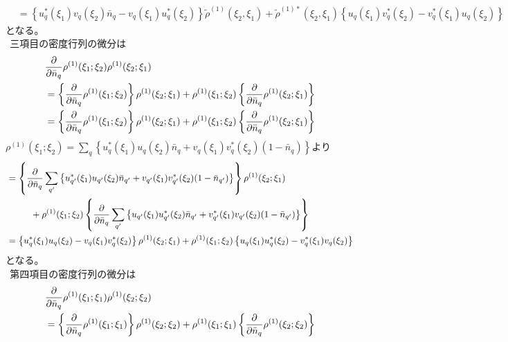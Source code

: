 \documentclass[dvipdfmx, 11pt, a4paper]{jsarticle}
\numberwithin{equation}{section}
\theoremstyle{definition}
\begin{document}
\begin{derivationBox}
\begin{align}
            &= \left\{ u_q^*(\xi_1) v_q(\xi_2)\bar{n}_q - v_q(\xi_1) u_q^*(\xi_2)\right\} \tilde{\rho}^{(1)}(\xi_2,\xi_1) +  \tilde{\rho}^{(1)*}(\xi_2,\xi_1)\left\{  u_q(\xi_1)v^*_q(\xi_2) - v^*_q(\xi_1)u_q(\xi_2)  \right\}
        \end{align}
        となる。\\
        $\ \ $三項目の密度行列の微分は
        \begin{align}
            &\frac{\partial}{\partial \bar{n}_q} \rho^{(1)}(\xi_1;\xi_2) \rho^{(1)}(\xi_2;\xi_1) \notag \\
            &= \left\{ \frac{\partial}{\partial \bar{n}_q} \rho^{(1)}(\xi_1;\xi_2) \right\} \rho^{(1)}(\xi_2;\xi_1)  +  \rho^{(1)}(\xi_1;\xi_2) \left\{ \frac{\partial}{\partial \bar{n}_q} \rho^{(1)}(\xi_2;\xi_1) \right\} \notag \\
            &= \left\{ \frac{\partial}{\partial \bar{n}_q} \rho^{(1)}(\xi_1;\xi_2) \right\} \rho^{(1)}(\xi_2;\xi_1)  +  \rho^{(1)}(\xi_1;\xi_2) \left\{ \frac{\partial}{\partial \bar{n}_q} \rho^{(1)}(\xi_2;\xi_1) \right\}
        \end{align}
        $\rho^{(1)}(\xi_1;\xi_2) = \sum_q\left\{ u_q^*(\xi_1)u_q(\xi_2)\bar{n}_q+v_q(\xi_1)v_q^*(\xi_2)(1-\bar{n}_q) \right\} $より
        \begin{align}
            &= \left\{ \frac{\partial}{\partial \bar{n}_q} \sum_{q'}\left\{ u_{q'}^*(\xi_1)u_{q'}(\xi_2)\bar{n}_{q'}+v_{q'}(\xi_1)v_{q'}^*(\xi_2)(1-\bar{n}_{q'}) \right\} \right\} \rho^{(1)}(\xi_2;\xi_1)  \notag \\
            &\ \ \ \ \ \ \ \ +  \rho^{(1)}(\xi_1;\xi_2) \left\{ \frac{\partial}{\partial \bar{n}_{q}} \sum_{q'}\left\{ u_{q'}(\xi_1)u_{q'}^*(\xi_2)\bar{n}_{q'}+v_{q'}^*(\xi_1)v_{q'}(\xi_2)(1-\bar{n}_{q'}) \right\} \right\} \notag \\
            &= \left\{ u_{q}^*(\xi_1)u_{q}(\xi_2)-v_{q}(\xi_1)v_{q}^*(\xi_2) \right\} \rho^{(1)}(\xi_2;\xi_1) +  \rho^{(1)}(\xi_1;\xi_2)  \left\{ u_{q}(\xi_1)u_{q}^*(\xi_2)-v_{q}^*(\xi_1)v_{q}(\xi_2)\right\} 
        \end{align}
        となる。\\
        $\ \ $第四項目の密度行列の微分は
        \begin{align}
            &\frac{\partial}{\partial  \bar{n}_q}\rho^{(1)}(\xi_1;\xi_1)\rho^{(1)}(\xi_2;\xi_2) \notag \\
            &= \left\{ \frac{\partial}{\partial  \bar{n}_q}\rho^{(1)}(\xi_1;\xi_1)\right\}\rho^{(1)}(\xi_2;\xi_2) + \rho^{(1)}(\xi_1;\xi_1)\left\{ \frac{\partial}{\partial  \bar{n}_q}\rho^{(1)}(\xi_2;\xi_2) \right\} \notag \\

\end{align}
\end{derivationBox}
\end{document}
